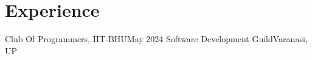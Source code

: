 \section{Experience}
\resumeSubHeadingListStart

    \resumeSubheading
    {Club Of Programmers, IIT-BHU}{May 2024}
    {Software Development Guild}{Varanasi, UP}
    \resumeItemListStart
    \resumeItemListEnd
    
     

\resumeSubHeadingListEnd